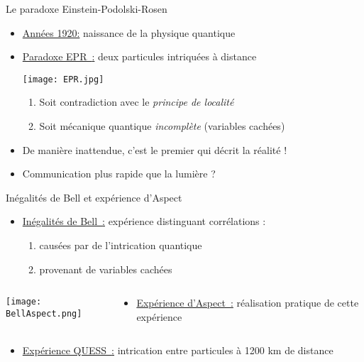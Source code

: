 \documentclass{beamer}
\theoremstyle{definition}
\theoremstyle{remark}
\begin{document}
\begin{frame}{Le paradoxe Einstein-Podolski-Rosen}

  \begin{itemize}
  \item \underline{Années 1920:} naissance de la physique quantique
    \pause
    \bigskip
  \item \underline{Paradoxe EPR~\cite{EPR35}:} deux particules intriquées à distance
    \begin{center}
      \texttt{[image: EPR.jpg]}
    \end{center}
    \pause
    \begin{enumerate}
    \item Soit contradiction avec le \emph{principe de localité}
    \item Soit mécanique quantique \emph{incomplète} (variables cachées)
    \end{enumerate}
    \pause
  \item De manière inattendue, c'est \alert{le premier} qui décrit la réalité !
  \item Communication plus rapide que la lumière ? 
  \end{itemize}
\end{frame}

\begin{frame}{Inégalités de Bell et expérience d'Aspect}
  \begin{itemize}
  \item \underline{Inégalités de Bell~\cite{Bell64}:} expérience distinguant corrélations :\begin{enumerate}
    \item causées par de l'intrication quantique
    \item provenant de variables cachées
  \end{enumerate}
  \end{itemize}
  \pause
  \begin{columns}
    \begin{column}{2cm}
      \texttt{[image: BellAspect.png]}
    \end{column}
    \begin{column}{6cm}
      \begin{itemize}
      \item \underline{Expérience d'Aspect~\cite{ADG82}:} réalisation pratique de cette expérience
      \end{itemize}
    \end{column}
    \end{columns}
    \pause
    \bigskip
    \begin{itemize}
  \item \underline{Expérience QUESS~\cite{Yin17}:} intrication entre particules à 1200 km de distance
  \end{itemize}
\end{frame}
\end{document}
